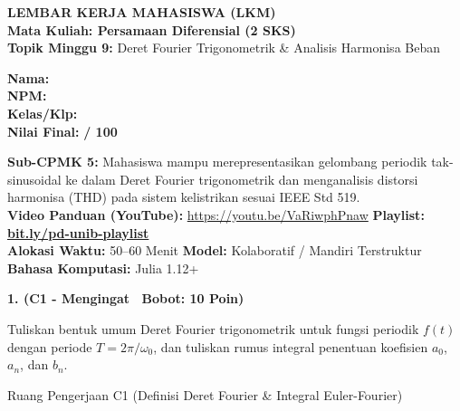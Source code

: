 \documentclass[10pt,a4paper]{article}
\begin{document}
\noindent\begin{minipage}[c]{0.68\textwidth}%
  {\large\textbf{\color{unibblue}LEMBAR KERJA MAHASISWA (LKM)}}\\[1mm]
  {\normalsize\textbf{Mata Kuliah: Persamaan Diferensial (2 SKS)}}\\[0.5mm]
  {\small\textbf{Topik Minggu 9:} Deret Fourier Trigonometrik \& Analisis Harmonisa Beban}%
\end{minipage}%
\hfill%
\begin{minipage}[c]{0.30\textwidth}%
  \begin{tcolorbox}[colback=unibblue!5,colframe=unibblue,boxrule=0.6pt,arc=2pt,left=4pt,right=4pt,top=2pt,bottom=2pt]
    \scriptsize
    \textbf{Nama:} \dotfill\\[1.2mm]
    \textbf{NPM:} \dotfill\\[1.2mm]
    \textbf{Kelas/Klp:} \dotfill\\[1.2mm]
    \textbf{Nilai Final:} \hfill \textbf{/ 100}
  \end{tcolorbox}%
\end{minipage}\par

\vspace{1.5mm}

\begin{tcolorbox}[colback=boxbg,colframe=unibgold!90!black,boxrule=0.6pt,arc=2pt,left=5pt,right=5pt,top=3pt,bottom=3pt,title=\textbf{\scriptsize Capaian Pembelajaran (Sub-CPMK 5) \& Pedoman Evaluasi OBE}]
  \scriptsize
  \textbf{Sub-CPMK 5:} Mahasiswa mampu merepresentasikan gelombang periodik tak-sinusoidal ke dalam Deret Fourier trigonometrik dan menganalisis distorsi harmonisa (THD) pada sistem kelistrikan sesuai IEEE Std 519.\\
  \textbf{Video Panduan (YouTube):} \url{https://youtu.be/VaRiwphPnaw} \hfill \textbf{Playlist:} \href{https://www.youtube.com/playlist?list=PLS5oOZWXZeTw}{\color{unibblue}\textbf{bit.ly/pd-unib-playlist}}\\\textbf{Alokasi Waktu:} 50--60 Menit \quad\textbar\quad \textbf{Model:} Kolaboratif / Mandiri Terstruktur \quad\textbar\quad \textbf{Bahasa Komputasi:} Julia 1.12+
\end{tcolorbox}

\vspace{1mm}

\noindent\textbf{1. (C1 - Mengingat \textbar\ Bobot: 10 Poin)}\par\vspace{0.5mm}
{\footnotesize Tuliskan bentuk umum Deret Fourier trigonometrik untuk fungsi periodik $f(t)$ dengan periode $T = 2\pi/\omega_0$, dan tuliskan rumus integral penentuan koefisien $a_0$, $a_n$, dan $b_n$.}
\begin{answerbox}{Ruang Pengerjaan C1 (Definisi Deret Fourier \& Integral Euler-Fourier)}
  \vspace{2.0cm}
\end{answerbox}
\end{document}
